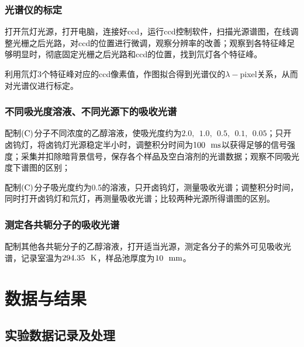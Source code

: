 \documentclass[12pt]{article}
\begin{document}
			\subsubsection{光谱仪的标定}
		打开氘灯光源，打开电脑，连接好ccd，运行ccd控制软件，扫描光源谱图，在线调整光栅之后光路，对ccd的位置进行微调，观察分辨率的改善；观察到各特征峰足够明显时，彻底固定光栅之后光路和ccd的位置，找到氘灯各个特征峰。\par
		利用氘灯3个特征峰对应的ccd像素值，作图拟合得到光谱仪的$\lambda-$pixel关系，从而对光谱仪进行标定。
		
			\subsubsection{不同吸光度溶液、不同光源下的吸收光谱}
			配制$\rm{(C})$分子不同浓度的乙醇溶液，使吸光度约为$2.0,\ \  1.0,\ \ 0.5,\ \ 0.1, \ \ 0.05$；只开卤钨灯，将卤钨灯光源稳定半小时，调整积分时间为$100 \ \ {\rm ms}$以获得足够的信号强度；采集并扣除暗背景信号，保存各个样品及空白溶剂的光谱数据；观察不同吸光度下谱图的区别；\par
			配制$\rm{(C})$分子吸光度约为0.5的溶液，只开卤钨灯，测量吸收光谱；调整积分时间，同时打开卤钨灯和氘灯，再测量吸收光谱；比较两种光源所得谱图的区别。
 	\subsubsection{测定各共轭分子的吸收光谱}
 	配制其他各共轭分子的乙醇溶液，打开适当光源，测定各分子的紫外可见吸收光谱，记录室温为$294.35 \ \ {\rm K}$，样品池厚度为$10 \ \ {\rm mm}$。

 \section{数据与结果}
 \subsection{实验数据记录及处理}
\end{document}
